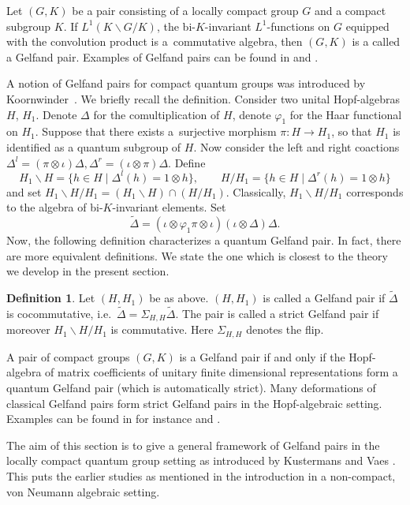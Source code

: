 \documentclass[pdftex]{sigma}
\numberwithin{equation}{section}
\theoremstyle{definition}
\newtheorem{dfn}[thm]{Definition}
\begin{document}
Let $(G, K)$ be a pair consisting of a locally compact group $G$ and a compact subgroup $K$. If $L^1(K \backslash G \slash K)$, the bi-$K$-invariant $L^1$-functions on $G$ equipped with the convolution product is a~commutative algebra, then $(G,K)$ is a called a Gelfand pair. Examples of Gelfand pairs can be found in \cite[Chapter~7]{Dij} and \cite{Far}.

A notion of Gelfand pairs for compact quantum groups was introduced by Koornwinder~\cite{Koo}. We brief\/ly recall the def\/inition. Consider two unital Hopf-algebras $H$, $H_1$. Denote $\Delta$ for the comultiplication of $H$, denote $\varphi_1$ for the Haar functional on $H_1$. Suppose that there exists a~surjective morphism $\pi: H \rightarrow H_1$, so that $H_1$ is identif\/ied as a quantum subgroup of $H$. Now consider the left and right coactions
$
\Delta^l = (\pi \otimes \iota) \Delta,  \Delta^r = (\iota \otimes \pi) \Delta.
$
 Def\/ine
\[
H_1 \backslash H   = \big\{ h \in H \mid \Delta^l(h) = 1 \otimes h\big\}, \qquad  H \slash H_1   = \big\{ h \in H \mid \Delta^r(h) = 1 \otimes h\big\}
\]
 and set $H_1 \backslash H  \slash H_1 = (H_1 \backslash H)  \cap (H  \slash H_1)$. Classically, $H_1 \backslash H  \slash H_1$ corresponds to the algebra of bi-$K$-invariant elements. Set
\[
\tilde{\Delta}  = (\iota \otimes \varphi_1 \pi \otimes \iota)(\iota \otimes \Delta) \Delta.
\]
Now, the following def\/inition characterizes a quantum Gelfand pair. In fact, there are more equivalent def\/initions. We state the one which is closest to the theory we develop in the present section.
\begin{dfn}
Let $(H, H_1)$ be as above. $(H, H_1)$ is called a Gelfand pair if $\tilde{\Delta}$ is cocommutative, i.e.\ $\tilde{\Delta} = \Sigma_{H, H} \tilde{\Delta}$. The pair is called a strict Gelfand pair if moreover $H_1 \backslash H  \slash H_1$ is commutative. Here $\Sigma_{H, H}$ denotes the f\/lip.
\end{dfn}

A pair of compact groups $(G, K)$ is a Gelfand pair if and only if the Hopf-algebra of matrix coef\/f\/icients of unitary f\/inite dimensional representations form a quantum Gelfand pair (which is automatically strict).  Many deformations of classical Gelfand pairs form   strict Gelfand pairs in the Hopf-algebraic setting. Examples  can be found in for instance \cite{Flo, KoeAsk, NouYamMim, VaiGel} and \cite{VaiHyp}.

The aim of this section is to give a general framework of Gelfand pairs in the locally compact quantum group setting as introduced by Kustermans and Vaes \cite{KusVae, KusVaeII}. This puts the earlier studies as mentioned in the introduction in a non-compact, von Neumann algebraic setting.
\end{document}
